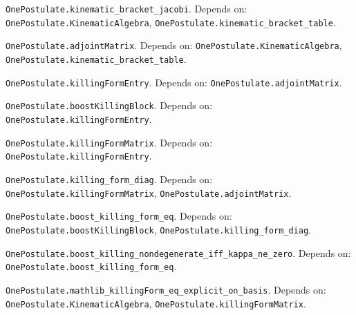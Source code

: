 \begin{lemma}\label{OnePostulate.kinematic_bracket_jacobi}
\texttt{OnePostulate.kinematic\_bracket\_jacobi}. Depends on: \texttt{OnePostulate.KinematicAlgebra}, \texttt{OnePostulate.kinematic\_bracket\_table}.
\end{lemma}

\begin{definition}\label{OnePostulate.adjointMatrix}
\texttt{OnePostulate.adjointMatrix}. Depends on: \texttt{OnePostulate.KinematicAlgebra}, \texttt{OnePostulate.kinematic\_bracket\_table}.
\end{definition}

\begin{definition}\label{OnePostulate.killingFormEntry}
\texttt{OnePostulate.killingFormEntry}. Depends on: \texttt{OnePostulate.adjointMatrix}.
\end{definition}

\begin{definition}\label{OnePostulate.boostKillingBlock}
\texttt{OnePostulate.boostKillingBlock}. Depends on: \texttt{OnePostulate.killingFormEntry}.
\end{definition}

\begin{definition}\label{OnePostulate.killingFormMatrix}
\texttt{OnePostulate.killingFormMatrix}. Depends on: \texttt{OnePostulate.killingFormEntry}.
\end{definition}

\begin{lemma}\label{OnePostulate.killing_form_diag}
\texttt{OnePostulate.killing\_form\_diag}. Depends on: \texttt{OnePostulate.killingFormMatrix}, \texttt{OnePostulate.adjointMatrix}.
\end{lemma}

\begin{lemma}\label{OnePostulate.boost_killing_form_eq}
\texttt{OnePostulate.boost\_killing\_form\_eq}. Depends on: \texttt{OnePostulate.boostKillingBlock}, \texttt{OnePostulate.killing\_form\_diag}.
\end{lemma}

\begin{lemma}\label{OnePostulate.boost_killing_nondegenerate_iff_kappa_ne_zero}
\texttt{OnePostulate.boost\_killing\_nondegenerate\_iff\_kappa\_ne\_zero}. Depends on: \texttt{OnePostulate.boost\_killing\_form\_eq}.
\end{lemma}

\begin{lemma}\label{OnePostulate.mathlib_killingForm_eq_explicit_on_basis}
\texttt{OnePostulate.mathlib\_killingForm\_eq\_explicit\_on\_basis}. Depends on: \texttt{OnePostulate.KinematicAlgebra}, \texttt{OnePostulate.killingFormMatrix}.
\end{lemma}

